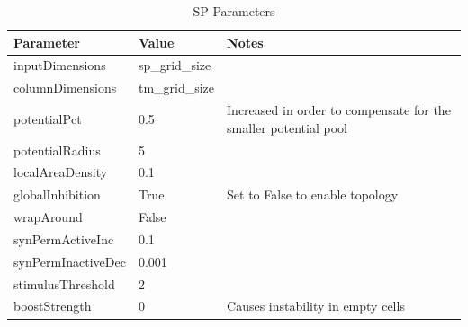 \begin{table}[H]
    \centering
    \begin{tabularx}{\linewidth}{@{}XlX@{}}
        \toprule
        \textbf{Parameter} & \textbf{Value} & \textbf{Notes}                                                  \\
        \midrule
        inputDimensions    & sp\_grid\_size &                                                                 \\
        columnDimensions   & tm\_grid\_size &                                                                 \\
        potentialPct       & 0.5            & Increased in order to compensate for the smaller potential pool \\
        potentialRadius    & 5              &                                                                 \\
        localAreaDensity   & 0.1            &                                                                 \\
        globalInhibition   & True           & Set to False to enable topology                                 \\
        wrapAround         & False          &                                                                 \\
        synPermActiveInc   & 0.1            &                                                                 \\
        synPermInactiveDec & 0.001                                                                            \\
        stimulusThreshold  & 2              &                                                                 \\
        boostStrength      & 0              & Causes instability in empty cells                               \\
        \bottomrule
    \end{tabularx}
    \caption{SP Parameters}
    \label{tab:bb_sp_gridhtm_param}
\end{table}
